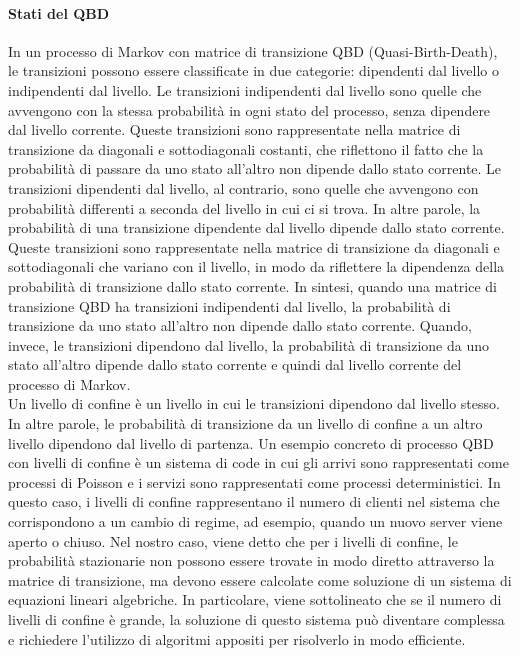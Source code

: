 \documentclass[11pt]{article}
\begin{document}
\paragraph{Stati del QBD} In un processo di Markov con matrice di transizione QBD (Quasi-Birth-Death), le transizioni possono essere classificate in due categorie: dipendenti dal livello o indipendenti dal livello. Le transizioni indipendenti dal livello sono quelle che avvengono con la stessa probabilità in ogni stato del processo, senza dipendere dal livello corrente. Queste transizioni sono rappresentate nella matrice di transizione da diagonali e sottodiagonali costanti, che riflettono il fatto che la probabilità di passare da uno stato all'altro non dipende dallo stato corrente. Le transizioni dipendenti dal livello, al contrario, sono quelle che avvengono con probabilità differenti a seconda del livello in cui ci si trova. In altre parole, la probabilità di una transizione dipendente dal livello dipende dallo stato corrente. Queste transizioni sono rappresentate nella matrice di transizione da diagonali e sottodiagonali che variano con il livello, in modo da riflettere la dipendenza della probabilità di transizione dallo stato corrente. In sintesi, quando una matrice di transizione QBD ha transizioni indipendenti dal livello, la probabilità di transizione da uno stato all'altro non dipende dallo stato corrente. Quando, invece, le transizioni dipendono dal livello, la probabilità di transizione da uno stato all'altro dipende dallo stato corrente e quindi dal livello corrente del processo di Markov. \\

Un livello di confine è un livello in cui le transizioni dipendono dal livello stesso. In altre parole, le probabilità di transizione da un livello di confine a un altro livello dipendono dal livello di partenza. Un esempio concreto di processo QBD con livelli di confine è un sistema di code in cui gli arrivi sono rappresentati come processi di Poisson e i servizi sono rappresentati come processi deterministici. In questo caso, i livelli di confine rappresentano il numero di clienti nel sistema che corrispondono a un cambio di regime, ad esempio, quando un nuovo server viene aperto o chiuso. Nel nostro caso, viene detto che per i livelli di confine, le probabilità stazionarie non possono essere trovate in modo diretto attraverso la matrice di transizione, ma devono essere calcolate come soluzione di un sistema di equazioni lineari algebriche. In particolare, viene sottolineato che se il numero di livelli di confine è grande, la soluzione di questo sistema può diventare complessa e richiedere l'utilizzo di algoritmi appositi per risolverlo in modo efficiente.
\end{document}
